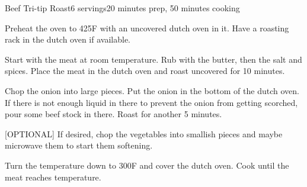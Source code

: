 \documentclass[../Cookbook.tex]{subfiles}
\begin{document}
\begin{recipe}{Beef Tri-tip Roast}{6 servings}{20 minutes prep, 50 minutes cooking}

	Preheat the oven to 425\0F with an uncovered dutch oven in it. Have a roasting rack in the dutch oven if available.

	Start with the meat at room temperature. Rub with the butter, then the salt and spices. Place the meat in the dutch oven and roast uncovered for 10 minutes.

	Chop the onion into large pieces. Put the onion in the bottom of the dutch oven. If there is not enough liquid in there to prevent the onion from getting scorched, pour some beef stock in there. Roast for another 5 minutes.

	[OPTIONAL] If desired, chop the vegetables into smallish pieces and maybe microwave them to start them softening.

	\newstep
	Turn the temperature down to 300\0F and cover the dutch oven. Cook until the meat reaches temperature.

\end{recipe}
\end{document}
